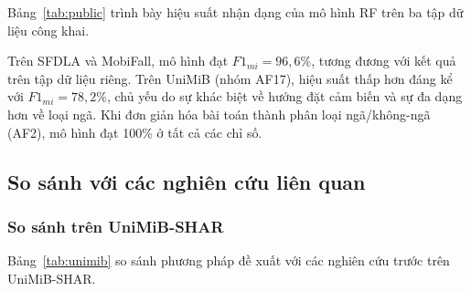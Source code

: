 Bảng~\ref{tab:public} trình bày hiệu suất nhận dạng của mô hình RF trên ba tập dữ liệu công khai.

\begin{table}[!htb]
    \caption{Kết quả đánh giá trên các tập dữ liệu công khai}
    \label{tab:public}
    \centering
    \footnotesize
    \renewcommand{\arraystretch}{1.2}
\end{table}

Trên SFDLA và MobiFall, mô hình đạt $F1_{mi} = 96{,}6\%$, tương đương với kết quả trên tập dữ liệu riêng. Trên UniMiB (nhóm AF17), hiệu suất thấp hơn đáng kể với $F1_{mi} = 78{,}2\%$, chủ yếu do sự khác biệt về hướng đặt cảm biến và sự đa dạng hơn về loại ngã. Khi đơn giản hóa bài toán thành phân loại ngã/không-ngã (AF2), mô hình đạt 100\% ở tất cả các chỉ số.

\subsection{So sánh với các nghiên cứu liên quan}

\subsubsection{So sánh trên UniMiB-SHAR}

Bảng~\ref{tab:unimib} so sánh phương pháp đề xuất với các nghiên cứu trước trên UniMiB-SHAR.

